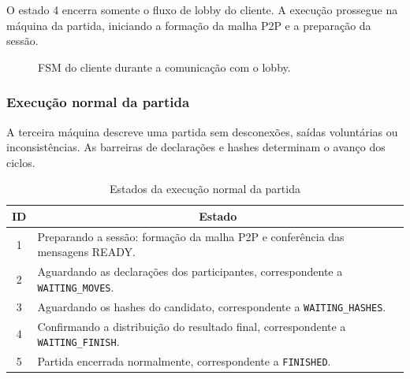 \documentclass[11pt,a4paper]{article}
\begin{document}
O estado 4 encerra somente o fluxo de lobby do cliente. A execução prossegue na máquina da partida, iniciando a formação da malha P2P e a preparação da sessão.

\begin{figure}[H]
    \centering
    \caption{FSM do cliente durante a comunicação com o lobby.}
    \label{fig:fsm_cliente_lobby}
\end{figure}

\subsubsection{Execução normal da partida}

A terceira máquina descreve uma partida sem desconexões, saídas voluntárias ou inconsistências. As barreiras de declarações e hashes determinam o avanço dos ciclos.

\begin{table}[H]
    \centering
    \caption{Estados da execução normal da partida}
    \label{tab:fsm_partida_estados}
    \begin{tabular}{|c|p{11.7cm}|}
        \hline
        \textbf{ID} & \multicolumn{1}{c|}{\textbf{Estado}} \\ \hline
        1 & Preparando a sessão: formação da malha P2P e conferência das mensagens READY. \\ \hline
        2 & Aguardando as declarações dos participantes, correspondente a \texttt{WAITING\_MOVES}. \\ \hline
        3 & Aguardando os hashes do candidato, correspondente a \texttt{WAITING\_HASHES}. \\ \hline
        4 & Confirmando a distribuição do resultado final, correspondente a \texttt{WAITING\_FINISH}. \\ \hline
        5 & Partida encerrada normalmente, correspondente a \texttt{FINISHED}. \\ \hline
    \end{tabular}
\end{table}
\end{document}
